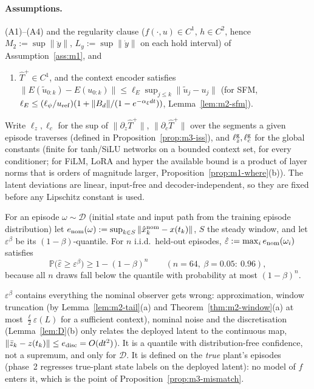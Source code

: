 \paragraph{Assumptions.} (A1)--(A4) and the regularity clause ($f(\cdot,u)\in C^1$, $h\in C^2$,
hence $M_2:=\sup\|\ddot y\|$, $L_y:=\sup\|\dot y\|$ on each hold interval) of
Assumption~\ref{ass:m1}, and
\begin{enumerate}
\item[(L)] $\hat T^{+}\in C^1$, and the context encoder satisfies
$\|E(\tilde u_{0:k})-E(u_{0:k})\|\le\ell_E\sup_{j\le k}\|\tilde u_j-u_j\|$ (for SFM,
$\ell_E\le(\ell_\psi/u_{\rm ref})(1+\|B_d\|/(1-e^{-\alpha_\xi dt}))$, Lemma~\ref{lem:m2-sfm}).
\end{enumerate}
Write $\ell_z,\ell_c$ for the sup of $\|\partial_z\hat T^{+}\|$, $\|\partial_c\hat T^{+}\|$ over the
segments a given episode traverses (defined in Proposition~\ref{prop:m3-iss}), and
$\ell^{\rm g}_z,\ell^{\rm g}_c$ for the global constants (finite for tanh/SiLU networks on a bounded
context set, for every conditioner; for FiLM, LoRA and hyper the available bound is a product of layer norms that is
orders of magnitude larger, Proposition~\ref{prop:m1-where}(b)). The latent deviations are linear,
input-free and decoder-independent, so they are fixed before any Lipschitz constant is used.

\begin{definition}\label{def:m3-fit}
For an episode $\omega\sim\mathcal D$ (initial state and input path from the training episode
distribution) let $e_{\rm nom}(\omega):=\sup_{k\in S}\|\hat x^{\rm nom}_k-x(t_k)\|$, $S$ the steady
window, and let $\varepsilon^\beta$ be its $(1-\beta)$-quantile. For $n$ i.i.d.\ held-out episodes,
$\hat\varepsilon:=\max_ie_{\rm nom}(\omega_i)$ satisfies
\begin{equation}\label{eq:m3-quantile}
\mathbb P\big(\hat\varepsilon\ge\varepsilon^\beta\big)\ge1-(1-\beta)^n\qquad(n=64,\ \beta=0.05:\ 0.96),
\end{equation}
because all $n$ draws fall below the quantile with probability at most $(1-\beta)^n$.
\end{definition}

$\varepsilon^\beta$ contains everything the nominal observer gets wrong: approximation, window
truncation (by Lemma~\ref{lem:m2-tail}(a) and Theorem~\ref{thm:m2-window}(a) at most $\tfrac{\ell}{2}\varepsilon(L)$
for a sufficient context), nominal noise and the discretisation (Lemma~\ref{lem:D}(b) only relates the
deployed latent to the continuous map, $\|\bar z_k-z(t_k)\|\le e_{\rm disc}=O(dt^2)$). It is a
quantile with distribution-free confidence, not a supremum, and only for $\mathcal D$. It is defined on the
\emph{true} plant's episodes (phase~2 regresses true-plant state labels on the deployed latent): no model of $f$
enters it, which is the point of Proposition~\ref{prop:m3-mismatch}.


